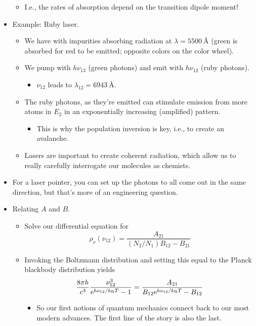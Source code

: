 \documentclass[../notes.tex]{subfiles}
\begin{document}
\begin{itemize}
\begin{equation*}
    \end{equation*}
    \begin{itemize}
        \item I.e., the rates of absorption depend on the transition dipole moment!
    \end{itemize}
    \item Example: Ruby laser.
    \begin{itemize}
        \item We have  with  impurities absorbing radiation at $\lambda=\SI{5500}{\angstrom}$ (green is absorbed for red to be emitted; opposite colors on the color wheel).
        \item We pump with $h\nu_{13}$ (green photons) and emit with $h\nu_{12}$ (ruby photons).
        \begin{itemize}
            \item $\nu_{12}$ leads to $\lambda_{12}=\SI{6943}{\angstrom}$.
        \end{itemize}
        \item The ruby photons, as they're emitted can stimulate emission from more atoms in $E_2$ in an exponentially increasing (amplified) pattern.
        \begin{itemize}
            \item This is why the population inversion is key, i.e., to create an avalanche.
        \end{itemize}
        \item Lasers are important to create coherent radiation, which allow us to really carefully interrogate our molecules as chemists.
    \end{itemize}
    \item For a laser pointer, you can set up the photons to all come out in the same direction, but that's more of an engineering question.
    \item Relating $A$ and $B$.
    \begin{itemize}
        \item Solve our differential equation for
        \begin{equation*}
            \rho_\nu(\nu_{12}) = \frac{A_{21}}{(N_2/N_1)B_{12}-B_{21}}
        \end{equation*}
        \item Invoking the Boltzmann distribution and setting this equal to the Planck blackbody distribution yields
        \begin{equation*}
            \frac{8\pi h}{c^3}\frac{\nu_{12}^3}{\e[h\nu_{12}/k_\text{B}T]-1} = \frac{A_{21}}{B_{12}\e[h\nu_{12}/k_\text{B}T]-B_{12}}
        \end{equation*}
        \begin{itemize}
            \item So our first notions of quantum mechanics connect back to our most modern advances. The first line of the story is also the last.
        \end{itemize}
    \end{itemize}
\end{itemize}
\end{document}
